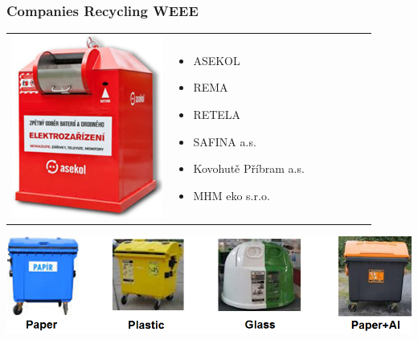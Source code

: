 \documentclass{beamer}
\begin{document}
	\begin{frame}
    \frametitle{Companies Recycling WEEE}
		\begin{center}
		\begin{tabular}{m{0.4\linewidth} m{0.5\linewidth}}
		\includegraphics[scale=0.4]{obr07_popelniceElektro.png} &
		
		\begin{itemize}
			\item ASEKOL
			\item REMA
			\item RETELA
			\item SAFINA a.s.
			\item Kovohutě Příbram a.s.
			\item MHM eko s.r.o.
		\end{itemize}
		\end{tabular}
		\includegraphics[scale=0.4]{obr08_popelniceRuzne.png}
		\end{center}
	\end{frame}
\end{document}

